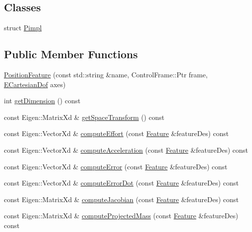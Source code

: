 \subsection*{Classes}
\begin{DoxyCompactItemize}
\item 
struct \hyperlink{structocra_1_1PositionFeature_1_1Pimpl}{Pimpl}
\end{DoxyCompactItemize}
\subsection*{Public Member Functions}
\begin{DoxyCompactItemize}
\item 
\hyperlink{classocra_1_1PositionFeature_abe283f029de484ca1eed44a1f9212f2f}{Position\+Feature} (const std\+::string \&name, Control\+Frame\+::\+Ptr frame, \hyperlink{namespaceocra_a436781c7059a0f76027df1c652126260}{E\+Cartesian\+Dof} axes)
\item 
int \hyperlink{classocra_1_1PositionFeature_a1f5cc9e711ceccc0cdff4fe1570a41ae}{get\+Dimension} () const 
\item 
const Eigen\+::\+Matrix\+Xd \& \hyperlink{classocra_1_1PositionFeature_a39c3b8fce61d5fbefae27b000efe2425}{get\+Space\+Transform} () const 
\item 
const Eigen\+::\+Vector\+Xd \& \hyperlink{classocra_1_1PositionFeature_ad44e9983e2e29d37d46448b996ad365e}{compute\+Effort} (const \hyperlink{classocra_1_1Feature}{Feature} \&feature\+Des) const 
\item 
const Eigen\+::\+Vector\+Xd \& \hyperlink{classocra_1_1PositionFeature_adea7a9d633de43a629b37096f9e82da8}{compute\+Acceleration} (const \hyperlink{classocra_1_1Feature}{Feature} \&feature\+Des) const 
\item 
const Eigen\+::\+Vector\+Xd \& \hyperlink{classocra_1_1PositionFeature_a0d15c54ec5425b6048f8d3979687ae2c}{compute\+Error} (const \hyperlink{classocra_1_1Feature}{Feature} \&feature\+Des) const 
\item 
const Eigen\+::\+Vector\+Xd \& \hyperlink{classocra_1_1PositionFeature_adb485b6e259745506e04c1d37492755b}{compute\+Error\+Dot} (const \hyperlink{classocra_1_1Feature}{Feature} \&feature\+Des) const 
\item 
const Eigen\+::\+Matrix\+Xd \& \hyperlink{classocra_1_1PositionFeature_a67d4ca32a9e10197afc3b088c9ad58e1}{compute\+Jacobian} (const \hyperlink{classocra_1_1Feature}{Feature} \&feature\+Des) const 
\item 
const Eigen\+::\+Matrix\+Xd \& \hyperlink{classocra_1_1PositionFeature_a912b4e2125cd76e745a76b3b06d27e8a}{compute\+Projected\+Mass} (const \hyperlink{classocra_1_1Feature}{Feature} \&feature\+Des) const 

\end{DoxyCompactItemize}
